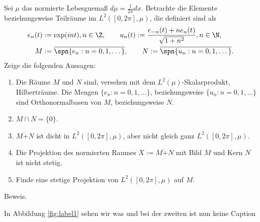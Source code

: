 \begin{exercise}
Sei $\mu$ das normierte Lebesguemaß $d\mu = \frac{1}{2\pi}dx$. Betrachte die Elemente
beziehungsweise Teilräume im $L^2([0,2\pi], \mu)$, die definiert sind als
\begin{align*}
  e_n(t) &:= \exp(int), n \in \Z, \qquad u_n(t) := \frac{e_{-n}(t) + ne_n(t)}{\sqrt{1+n^2}}, n \in \N, \\
  M &:= \overline{\spn\{e_n: n = 0,1,\dots\}}, \qquad N := \overline{\spn\{u_n: n = 0,1,\dots\}}.
\end{align*}
Zeige die folgenden Aussagen:
\begin{enumerate}[label = (\alph*)]
  \item Die Räume $M$ und $N$ sind, versehen mit dem $L^2(\mu)$-Skalarprodukt, Hilberträume.
  Die Mengen $\{e_n: n = 0,1,\dots\}$, beziehungsweise
  $\{u_n: n = 0,1,\dots\}$ sind Orthonormalbasen von $M$, beziehungsweise $N$.
  \item $M \cap N = \{0\}$.
  \item $M \dot+ N$ ist dicht in $L^2([0,2\pi],\mu)$, aber nicht gleich ganz $L^2([0,2\pi],\mu)$.
  \item Die Projektion des normierten Raumes $X := M \dot + N$ mit Bild $M$ und Kern $N$
  ist nicht stetig.
  \item Finde eine stetige Projektion von $L^2([0,2\pi],\mu)$ auf $M$.
\end{enumerate}
\end{exercise}
\begin{solution}
Beweis.


In Abbildung \ref{fig:label1} sehen wir was und bei der zweiten ist nun keine
Caption
\end{solution}
